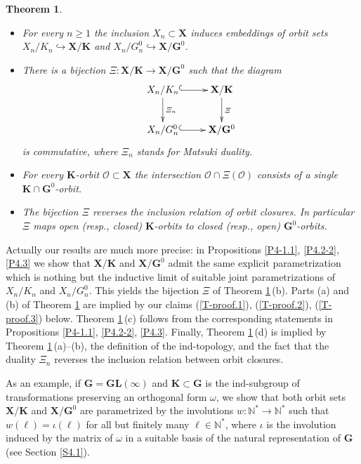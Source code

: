 \documentclass{amsart}
\newtheorem{theorem}{Theorem}
\theoremstyle{definition}
\newcommand{\bs}[1]{\boldsymbol{#1}}
\begin{document}
\begin{theorem}
\label{theorem-1}
\begin{itemize}
\item[\rm (a)] For every $n\geq 1$ the inclusion $X_n\subset \mathbf{X}$
induces embeddings of orbit sets $X_n/K_n\hookrightarrow \mathbf{X}/\mathbf{K}$
and $X_n/G^0_n\hookrightarrow \mathbf{X}/\mathbf{G}^0$.
\item[\rm (b)] There is a bijection $\Xi:\mathbf{X}/\mathbf{K}\to\mathbf{X}/\mathbf{G}^0$
such that the diagram
\begin{equation}
\label{eq:diag}\begin{gathered}
\xymatrix{
X_n/K_n \ar@{->}[d]^{\Xi_n} \ar@{^{(}->}[r] & \mathbf{X}/\mathbf{K} \ar@{->}[d]^{\Xi} \\
X_n/G^0_n \ar@{^{(}->}[r] & \mathbf{X}/\mathbf{G}^0
}
\end{gathered}
\end{equation}
is commutative, where $\Xi_n$ stands for Matsuki duality.
\item[\rm (c)] For every $\mathbf{K}$-orbit $\bs{\mathcal{O}}\subset\mathbf{X}$
the intersection $\bs{\mathcal{O}}\cap\Xi(\bs{\mathcal{O}})$ consists of a single $\mathbf{K}\cap\mathbf{G}^0$-orbit.
\item[\rm (d)] The bijection $\Xi$ reverses the inclusion relation of orbit closures.
In particular $\Xi$ maps open (resp., closed) $\mathbf{K}$-orbits to
closed (resp., open) $\mathbf{G}^0$-orbits.
\end{itemize}
\end{theorem}

Actually our results are much more precise: in Propositions \ref{P4-1.1}, \ref{P4.2-2}, \ref{P4.3} we show that $\mathbf{X}/\mathbf{K}$ and $\mathbf{X}/\mathbf{G}^0$ admit the same explicit parametrization which is nothing but the inductive limit of suitable joint parametrizations of $X_n/K_n$ and $X_n/G_n^0$.  This yields the bijection $\Xi$ of Theorem \ref{theorem-1}\,{\rm (b)}. Parts {\rm (a)} and {\rm (b)} of Theorem \ref{theorem-1} are
implied by our claims (\ref{T-proof.1}), (\ref{T-proof.2}), (\ref{T-proof.3}) below. Theorem \ref{theorem-1}\,{\rm (c)} follows from the corresponding statements in Propositions \ref{P4-1.1}, \ref{P4.2-2}, \ref{P4.3}.
Finally, Theorem \ref{theorem-1}\,{\rm (d)} is implied by 
Theorem \ref{theorem-1}\,{\rm (a)}--{\rm (b)}, the definition of the ind-topology, 
and the fact that the duality $\Xi_n$ reverses the inclusion relation between orbit closures.

As an example, if $\mathbf{G}=\mathbf{GL}(\infty)$ and $\mathbf{K}\subset\mathbf{G}$ is the ind-subgroup of transformations preserving an orthogonal form $\omega$, we show that both orbit sets $\mathbf{X}/\mathbf{K}$ and $\mathbf{X}/\mathbf{G}^0$ are parametrized by the involutions $w:\mathbb{N}^*\to\mathbb{N}^*$
such that $w(\ell)=\iota(\ell)$ for all but finitely many $\ell\in\mathbb{N}^*$,
where $\iota$ is the involution induced by the matrix of $\omega$ in a suitable basis of the natural representation of $\mathbf{G}$
(see Section \ref{S4.1}).
\end{document}
